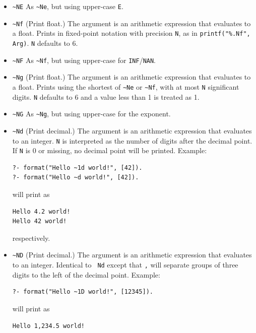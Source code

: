\begin{description}
\begin{itemize}
\item \verb|~NE|
As \verb|~Ne|, but using upper-case {\tt E}.

\item \verb|~Nf|
(Print float.) The argument is an arithmetic expression that evaluates
to a float.  Prints in fixed-point notation with precision {\tt N}, as
in \verb|printf("%.Nf", Arg)|.  {\tt N} defaults to 6.

\item \verb|~NF|
As \verb|~Nf|, but using upper-case for {\tt INF}/{\tt NAN}.

\item \verb|~Ng|
(Print float.) The argument is an arithmetic expression that evaluates
to a float.  Prints using the shortest of \verb|~Ne| or \verb|~Nf|,
with at most {\tt N} significant digits.  {\tt N} defaults to 6 and a
value less than 1 is treated as 1.

\item \verb|~NG|
As \verb|~Ng|, but using upper-case for the exponent.

\item \verb|~Nd|
(Print decimal.) The argument is an arithmetic expression that evaluates
to an integer. {\tt N} is interpreted as the number of digits after the
decimal point.  If {\tt N} is 0 or missing, no decimal point will be
printed.  Example:  

\begin{verbatim}
?- format("Hello ~1d world!", [42]).
?- format("Hello ~d world!", [42]).
\end{verbatim}

\noindent
will print as

\begin{verbatim}
Hello 4.2 world!
Hello 42 world!
\end{verbatim}

\noindent
respectively.

\item \verb|~ND|
(Print decimal.) The argument is an arithmetic expression that evaluates
to an integer.  Identical to {\tt ~Nd}
except that {\tt ,} will separate groups of three digits to the left of the
decimal point.  Example:  

\begin{verbatim}
?- format("Hello ~1D world!", [12345]).
\end{verbatim}

\noindent
will print as

\begin{verbatim}
Hello 1,234.5 world!
\end{verbatim}


\end{itemize}
\end{description}
